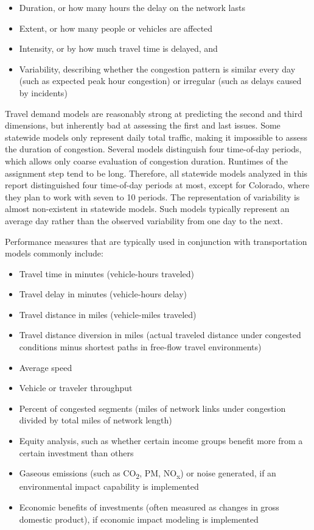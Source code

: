 \begin{itemize}
\item Duration, or how many hours the delay on the network lasts
\item Extent, or how many people or vehicles are affected
\item Intensity, or by how much travel time is delayed, and
\item Variability, describing whether the congestion pattern is similar every day (such as expected peak hour congestion) or irregular (such as delays caused by incidents)
\end{itemize}

Travel demand models are reasonably strong at predicting the second and third dimensions, but inherently bad at assessing the first and last issues. Some statewide models only represent daily total traffic, making it impossible to assess the duration of congestion. Several models distinguish four time-of-day periods, which allows only coarse evaluation of congestion duration. Runtimes of the assignment step tend to be long. Therefore, all statewide models analyzed in this report distinguished four time-of-day periods at most, except for Colorado, where they plan to work with seven to 10 periods. The representation of variability is almost non-existent in statewide models. Such models typically represent an average day rather than the observed variability from one day to the next.

Performance measures that are typically used in conjunction with transportation models commonly include:

\begin{itemize}
\item Travel time in minutes (vehicle-hours traveled)
\item Travel delay in minutes (vehicle-hours delay)
\item Travel distance in miles (vehicle-miles traveled)
\item Travel distance diversion in miles (actual traveled distance under congested conditions minus shortest paths in free-flow travel environments)
\item Average speed
\item Vehicle or traveler throughput
\item Percent of congested segments (miles of network links under congestion divided by total miles of network length)
\item Equity analysis, such as whether certain income groups benefit more from a certain investment than others
\item Gaseous emissions (such as CO\textsubscript{2}, PM, NO\textsubscript{x}) or noise generated, if an environmental impact capability is implemented
\item Economic benefits of investments (often measured as changes in gross domestic product), if economic impact modeling is implemented
\end{itemize}

